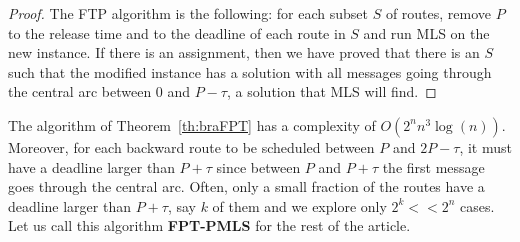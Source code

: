 \documentclass[10pt, conference, letterpaper]{IEEEtran}
\begin{document}
\begin{proof}
The FTP algorithm is the following: for each subset $S$ of routes, remove $P$ to the release time and to the deadline of each route in $S$ and run MLS on the new instance. If there is an assignment, then we have proved that there is an $S$ such that the modified instance has a solution with all messages going through the central arc between $0$ and $P - \tau$, a solution that MLS will find.
\end{proof}

The algorithm of Theorem~\ref{th:braFPT} has a complexity of $O(2^nn^3\log(n))$. Moreover, for each backward route to be scheduled between $P$ and $2P-\tau$, it must have a deadline larger than $P + \tau$ since between $P$ and $P + \tau$ the first message goes through the central arc. Often, only a small fraction of the routes have a deadline larger than $P + \tau$, say $k$ of them and we explore only $2^k << 2^n$ cases. Let us call this algorithm {\bf FPT-PMLS} for the rest of the article.
\end{document}
